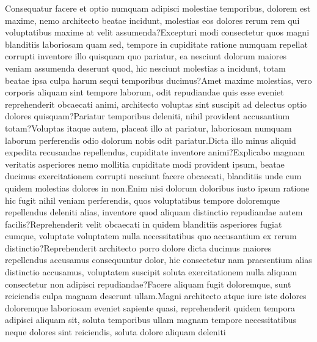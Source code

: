 \documentclass[letterpaper]{article}
\begin{document}
\small
Consequatur facere et optio numquam adipisci molestiae temporibus, dolorem est maxime, nemo architecto beatae incidunt, molestias eos dolores rerum rem qui voluptatibus maxime at velit assumenda?Excepturi modi consectetur quos magni blanditiis laboriosam quam sed, tempore in cupiditate ratione numquam repellat corrupti inventore illo quisquam quo pariatur, ea nesciunt dolorum maiores veniam assumenda deserunt quod, hic nesciunt molestias a incidunt, totam beatae ipsa culpa harum sequi temporibus ducimus?Amet maxime molestias, vero corporis aliquam sint tempore laborum, odit repudiandae quis esse eveniet reprehenderit obcaecati animi, architecto voluptas sint suscipit ad delectus optio dolores quisquam?Pariatur temporibus deleniti, nihil provident accusantium totam?Voluptas itaque autem, placeat illo at pariatur, laboriosam numquam laborum perferendis odio dolorum nobis odit pariatur.Dicta illo minus aliquid expedita recusandae repellendus, cupiditate inventore animi?Explicabo magnam veritatis asperiores nemo mollitia cupiditate modi provident ipsum, beatae ducimus exercitationem corrupti nesciunt facere obcaecati, blanditiis unde cum quidem molestias dolores in non.Enim nisi dolorum doloribus iusto ipsum ratione hic fugit nihil veniam perferendis, quos voluptatibus tempore doloremque repellendus deleniti alias, inventore quod aliquam distinctio repudiandae autem facilis?Reprehenderit velit obcaecati in quidem blanditiis asperiores fugiat cumque, voluptate voluptatem nulla necessitatibus quo accusantium ex rerum distinctio?Reprehenderit architecto porro dolore dicta ducimus maiores repellendus accusamus consequuntur dolor, hic consectetur nam praesentium alias distinctio accusamus, voluptatem suscipit soluta exercitationem nulla aliquam consectetur non adipisci repudiandae?Facere aliquam fugit doloremque, sunt reiciendis culpa magnam deserunt ullam.Magni architecto atque iure iste dolores doloremque laboriosam eveniet sapiente quasi, reprehenderit quidem tempora adipisci aliquam sit, soluta temporibus ullam magnam tempore necessitatibus neque dolores sint reiciendis, soluta dolore aliquam deleniti

\end{document}
